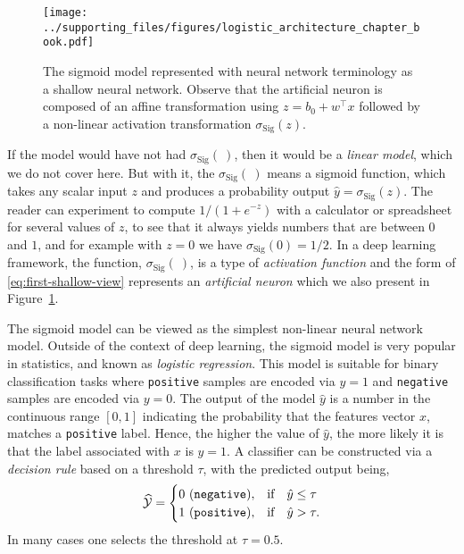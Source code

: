 \begin{figure}[h]
\begin{center}
\texttt{[image: ../supporting\_files/figures/logistic\_architecture\_chapter\_book.pdf]}
\end{center}
\caption{The sigmoid model represented with neural network terminology as a shallow neural network. Observe that the artificial neuron is composed of an affine transformation using $z = b_0 + w^\top x$ followed by a non-linear activation transformation 
$\sigma_{\text{Sig}}(z)$.} %
\label{fig:niceneuron}
\end{figure}

If the model would have not had $\sigma_{\text{Sig}}(~)$, then it would be a {\em linear model}, which we do not cover here. But with it, the $\sigma_{\text{Sig}}(~)$ means a sigmoid function, which takes any scalar input $z$ and produces a probability output $\hat{y}=\sigma_{\text{Sig}}(z)$. The reader can experiment to compute $1/(1+e^{-z})$ with a calculator or spreadsheet for several values of $z$, to see that it always yields numbers that are between $0$ and $1$, and for example with $z=0$ we have $\sigma_{\text{Sig}}(0) = 1/2$. In a deep learning framework, the function, $\sigma_{\text{Sig}}(~)$, is a type of {\em activation function} and the form of \eqref{eq:first-shallow-view} represents an \textit{artificial neuron} which we also present in Figure~\ref{fig:niceneuron}. 


The sigmoid model can be viewed as the simplest non-linear neural network model. %
Outside of the context of deep learning, the sigmoid model is very popular in statistics, and known as {\em logistic regression}. This model is suitable for binary classification tasks where \texttt{positive} samples are encoded via $y=1$ and \texttt{negative} samples are encoded via $y=0$.  The output of the model $\hat{y}$ is a number in the continuous range $[0,1]$ indicating the probability that the features vector $x$, matches a \texttt{positive} label. Hence, the higher the value of $\hat{y}$, the more likely it is that the label associated with $x$ is $y=1$. A classifier can be constructed via a \textit{decision rule} based on a threshold $\tau$, with the predicted output being,
%
\begin{equation} %
\label{eq:y-hat-tau}
\widehat{\cal Y} = 
\begin{cases}
0~ (\texttt{negative}), & \text{if} \quad  \hat{y} \le \tau \\
1~ (\texttt{positive}), & \text{if} \quad   \hat{y} > \tau.
\end{cases}
\end{equation}
In many cases one selects the threshold at $\tau = 0.5$. \\

